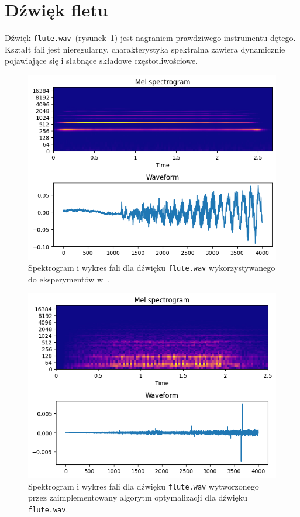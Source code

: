 \newpage

\section{Dźwięk fletu}

Dźwięk \texttt{flute.wav}~(rysunek~\ref{fig:literature_flute_sound_overview})
jest nagraniem prawdziwego instrumentu dętego. Kształt fali jest nieregularny,
charakterystyka spektralna zawiera dynamicznie pojawiające się i słabnące 
składowe częstotliwościowe.

\begin{figure}[H]
    \centering
    \includegraphics[width=0.7\linewidth]{rys06/target_sample_flute_literature.png}
    \caption{
      Spektrogram i wykres fali dla dźwięku \texttt{flute.wav} wykorzystywanego
      do eksperymentów w~\cite{evolutionary_puredata_results}.
    }\label{fig:literature_flute_sound_overview}
\end{figure}

\begin{figure}[H]
    \centering
    \includegraphics[width=0.7\linewidth]{rys06/evolved_sample_flute.png}
    \caption{
      Spektrogram i wykres fali dla dźwięku \texttt{flute.wav}
      wytworzonego przez zaimplementowany algorytm optymalizacji
      dla dźwięku \texttt{flute.wav}.
    }\label{fig:evolved_flute_sound_overview}
\end{figure}


